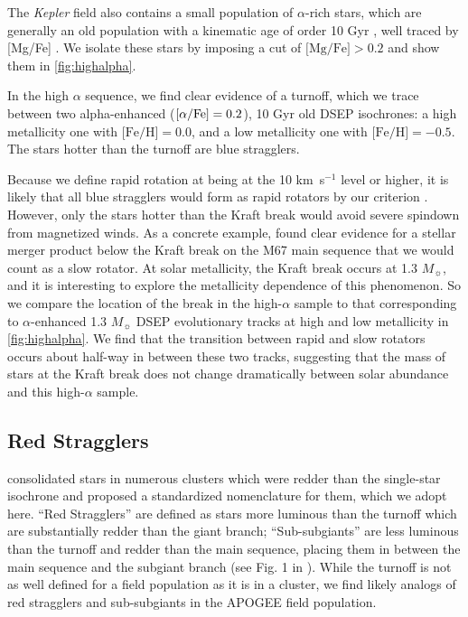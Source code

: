 \documentclass[preprint2]{aastex62}
\newcommand{\Kepler}{\mbox{\textit{Kepler}}}
\newcommand{\kms}{\textrm{km~s}\ensuremath{^{-1}}}
\newcommand{\feh}{\textrm{[Fe/H]}}
\newcommand{\afe}{\textrm{[\ensuremath{\alpha}/Fe]}}
\newcommand{\mgfe}{\textrm{[Mg/Fe]}}
\begin{document}
The \Kepler{} field also contains a small population of \(\alpha\)-rich stars, 
which are generally an old population with a kinematic age of order 10 Gyr 
\citep{Schuster12}, well traced by \mgfe{} \citep{Hayes18}.  We isolate these 
stars by imposing a cut of \(\mgfe > 0.2\) and show them in 
\cref{fig:highalpha}.

In the high \(\alpha\) sequence, we find clear evidence of a turnoff,
which we trace between two alpha-enhanced (\(\afe = 0.2\)), 10 Gyr old DSEP isochrones: a
high metallicity one with \(\feh=0.0\), and a low metallicity one with \(\feh =
-0.5\). The stars hotter than the turnoff are blue stragglers.

Because we define rapid rotation at being at the 10 \kms{} level or higher, it is likely that all blue stragglers would form as rapid rotators by our criterion \citep{Sills05, Mucciarelli14}. However, only the stars hotter than the Kraft break would avoid severe spindown from magnetized winds. As a concrete example, \citet{Sandquist18} found clear evidence for a stellar merger product below the Kraft break on the M67 main sequence that we would count as a slow rotator. At solar metallicity, the Kraft break
occurs at 1.3 \(M_\sun\), and it is interesting to explore the metallicity
dependence of this phenomenon. So we
compare the location of the break in the high-\(\alpha\) sample to that
corresponding to \(\alpha\)-enhanced 1.3 \(M_\sun\) DSEP evolutionary tracks at
high and low metallicity in \cref{fig:highalpha}. We
find that the transition between rapid and slow rotators occurs about half-way
in between these two tracks, suggesting that the mass of stars at the Kraft
break does not change dramatically between solar abundance and this 
high-\(\alpha\) sample. 


\subsection{Red Stragglers}
\label{sec:redstragglers}

\citet{Geller17} consolidated stars in numerous clusters which were redder than
the single-star isochrone and proposed a standardized nomenclature for them,
which we adopt here. ``Red Stragglers'' are defined as stars more luminous
than the turnoff which are substantially redder than the giant branch;
``Sub-subgiants'' are less luminous than the turnoff and redder than the main
sequence, placing them in between the main sequence and the subgiant branch
(see Fig. 1 in \citet{Geller17}).  
While the turnoff is not as well defined for a field population as it is in 
a cluster, we find likely analogs of red stragglers and sub-subgiants in the 
APOGEE field population. 
\end{document}
